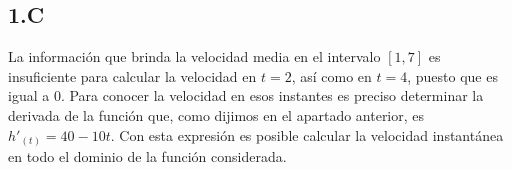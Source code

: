 \subsection*{1.C}

La información que brinda la velocidad media en el intervalo $[1, 7]$ es insuficiente para calcular la velocidad en $t=2$, así como en $t=4$, puesto que es igual a 0. Para conocer la velocidad en esos instantes es preciso determinar la derivada de la función que, como dijimos en el apartado anterior, es $h'_{(t)}=40-10t$. Con esta expresión es posible calcular la velocidad instantánea en todo el dominio de la función considerada.